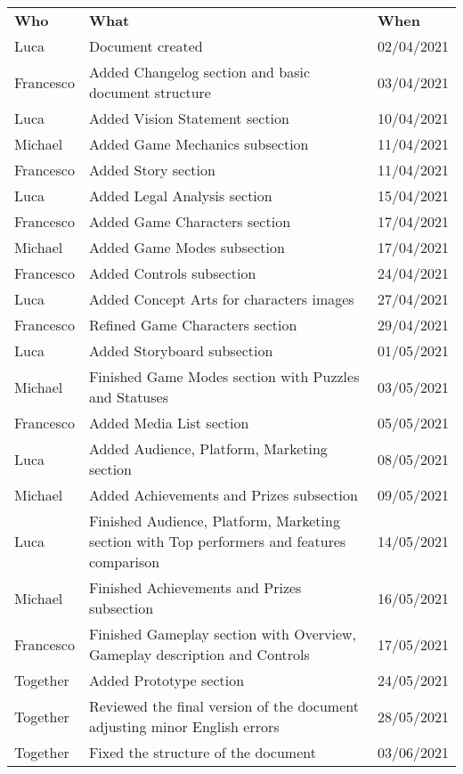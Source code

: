 \begin{longtable}{ m{2cm}m{8cm}m{3cm}} 
\centering 
 \textbf{Who}& \textbf{What} & \textbf{When}\\
Luca &			Document created			& 																	02/04/2021\\
Francesco & 	Added Changelog section and basic document structure	&										03/04/2021\\
Luca &			Added Vision Statement section &																10/04/2021\\
Michael	& 		Added Game Mechanics subsection &																11/04/2021\\
Francesco &		Added Story section  & 																			11/04/2021\\
Luca &			Added Legal Analysis section & 																	15/04/2021\\
Francesco &		Added Game Characters section & 																17/04/2021\\
Michael &		Added Game Modes subsection & 																	17/04/2021\\
Francesco &		Added Controls subsection & 																	24/04/2021\\
Luca &			Added Concept Arts for characters images &														27/04/2021\\
Francesco & 	Refined Game Characters section &																29/04/2021\\
Luca &			Added Storyboard subsection & 																	01/05/2021\\
Michael &		Finished Game Modes section with Puzzles and Statuses & 										03/05/2021\\
Francesco &		Added Media List section & 																		05/05/2021\\
Luca &			Added Audience, Platform, Marketing section & 													08/05/2021\\
Michael	&		Added Achievements and Prizes subsection &														09/05/2021\\
Luca & 			Finished Audience, Platform, Marketing section with Top performers and features comparison & 	14/05/2021\\
Michael &		Finished Achievements and Prizes subsection & 													16/05/2021\\
Francesco &		Finished Gameplay section with Overview, Gameplay description and Controls & 					17/05/2021\\
Together &		Added Prototype section & 																		24/05/2021\\
Together &		Reviewed the final version of the document adjusting minor English errors &  					28/05/2021\\
Together & 		Fixed the structure of the document  &  														03/06/2021\\
\end{longtable}
\pagebreak

